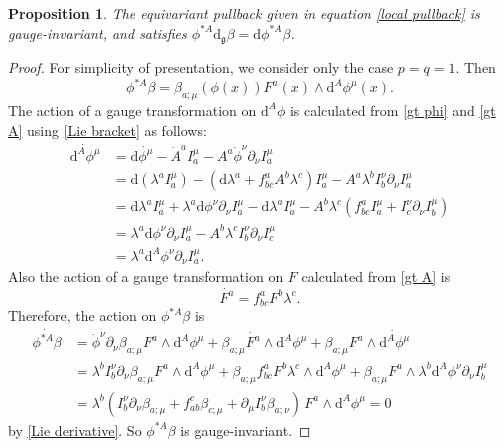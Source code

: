 \documentclass[10pt,a4paper]{amsart}
\newcommand{\g}{{\mathfrak{g}}}
\newcommand{\1}{{\mathbb{1}}}
\def \d{\mathrm{d}}
\numberwithin{equation}{section}
\newtheorem{Proposition}[Theorem]{Proposition}
 { \theoremstyle{definition}
\newtheorem{Definition}[Theorem]{Definition}
\newtheorem{Note}[Theorem]{Note}
\newtheorem{Example}[Theorem]{Example}
\newtheorem{Remark}[Theorem]{Remark} }
\begin{document}
\begin{Proposition}\label{Prop:pullback-properties}
The equivariant pullback given in equation \eqref{local pullback} is gauge-invariant, and satisfies $\phi^{\ast A}\d_\g\beta = \d\phi^{\ast A}\beta$.
\end{Proposition}
\begin{proof}
For simplicity of presentation, we consider only the case $p=q=1$. Then
\begin{equation*}
\phi^{\ast A}\beta = \beta_{a;\mu}(\phi(x))F^a(x)\wedge \d^A\phi^\mu(x) .
\end{equation*}
The action of a gauge transformation on $\d^A\phi$ is calculated from \eqref{gt phi} and \eqref{gt A} using \eqref{Lie bracket} as follows:
\begin{align*}
\dot{\d^A\phi^\mu}&=\d \dot{\phi^\mu}-\dot{A}^aI_a^\mu-A^a\dot{\phi}^\nu\partial_\nu I_a^\mu \\
&=\d(\lambda^a I_a^\mu)-(\d\lambda^a+f^a_{bc}A^b\lambda^c)I_a^\mu - A^a\lambda^bI_b^\nu\partial_\nu I_a^\mu \\
&=\d\lambda^a I_a^\mu + \lambda^a\d\phi^\nu \partial_\nu I_a^\mu-\d\lambda^aI_a^\mu-A^b\lambda^c(f^a_{bc}I_a^\mu + I_c^\nu\partial_\nu I_b^\mu) \\
&=\lambda^a\d\phi^\nu \partial_\nu I_a^\mu-A^b\lambda^cI_b^\nu\partial_\nu I_c^\mu \\
&=\lambda^a \d^A\phi^\nu\partial_\nu I_a^\mu.
\end{align*}
Also the action of a gauge transformation on $F$ calculated from \eqref{gt A} is
\begin{equation*}
\dot{F^a}=f^a_{bc}F^b\lambda^c.
\end{equation*}
Therefore, the action on $\phi^{\ast A}\beta$ is{\samepage
\begin{align*}
\dot{\phi^{\ast A}\beta}&=\dot\phi^\nu\partial_\nu\beta_{a;\mu}F^a\wedge \d^A\phi^\mu + \beta_{a;\mu}\dot{F^a}\wedge \d^A\phi^\mu + \beta_{a;\mu}F^a\wedge \dot{\d^A\phi^\mu} \\
&=\lambda^bI_b^\nu\partial_\nu\beta_{a;\mu}F^a\wedge \d^A\phi^\mu + \beta_{a;\mu}f^a_{bc}F^b\lambda^c\wedge \d^A\phi^\mu + \beta_{a;\mu}F^a\wedge \lambda^b \d^A\phi^\nu\partial_\nu I_b^\mu \\
&=\lambda^b(I_b^\nu\partial_\nu\beta_{a;\mu} + f^c_{ab}\beta_{c;\mu} + \partial_\mu I_b^\nu\beta_{a;\nu})\,F^a\wedge \d^A\phi^\mu
=0
\end{align*}
by \eqref{Lie derivative}. So $\phi^{\ast A}\beta$ is gauge-invariant.}


\end{proof}
\end{document}
